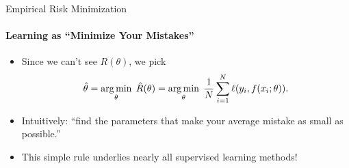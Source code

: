 \begin{frame}{Empirical Risk Minimization}
  \framesubtitle{Learning as “Minimize Your Mistakes”}
  \begin{itemize}
    \item Since we can’t see $R(\theta)$, we pick
          \[
            \hat\theta
            = \operatorname*{arg\,min}_{\theta}\;\hat R(\theta)
            = \operatorname*{arg\,min}_{\theta}\;\frac{1}{N}\sum_{i=1}^N \ell(y_i, f(x_i;\theta)).
          \]
    \item Intuitively: “find the parameters that make your average mistake as small as possible.”
    \item This simple rule underlies nearly all supervised learning methods!
  \end{itemize}
\end{frame}
